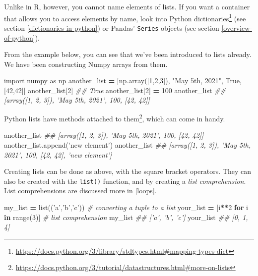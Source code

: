 \documentclass[12pt,krantz2]{krantz}
\makeatletter
\newenvironment{Shaded}{\begin{snugshade}}{\end{snugshade}}
\newcommand{\BuiltInTok}[1]{#1}
\newcommand{\CommentTok}[1]{\textcolor[rgb]{0.37,0.37,0.37}{\textit{#1}}}
\newcommand{\ControlFlowTok}[1]{\textcolor[rgb]{0.27,0.27,0.27}{\textbf{#1}}}
\newcommand{\DecValTok}[1]{\textcolor[rgb]{0.06,0.06,0.06}{#1}}
\newcommand{\ImportTok}[1]{#1}
\newcommand{\KeywordTok}[1]{\textcolor[rgb]{0.27,0.27,0.27}{\textbf{#1}}}
\newcommand{\NormalTok}[1]{#1}
\newcommand{\OperatorTok}[1]{\textcolor[rgb]{0.43,0.43,0.43}{\textbf{#1}}}
\newcommand{\StringTok}[1]{\textcolor[rgb]{0.5,0.5,0.5}{#1}}
\newcommand{\VariableTok}[1]{\textcolor[rgb]{0,0,0}{#1}}
\renewcommand{\href}[2]{#2\footnote{\url{#1}}}
\newenvironment{kframe}{%
\medskip{}
\setlength{\fboxsep}{.8em}
 \def\at@end@of@kframe{}%
 \ifinner\ifhmode%
  \def\at@end@of@kframe{\end{minipage}}%
  \begin{minipage}{\columnwidth}%
 \fi\fi%
 \def\FrameCommand##1{\hskip\@totalleftmargin \hskip-\fboxsep
 \colorbox{shadecolor}{##1}\hskip-\fboxsep
     \hskip-\linewidth \hskip-\@totalleftmargin \hskip\columnwidth}%
 \MakeFramed {\advance\hsize-\width
   \@totalleftmargin\z@ \linewidth\hsize
   \@setminipage}}%
 {\par\unskip\endMakeFramed%
 \at@end@of@kframe}
\renewenvironment{Shaded}{\begin{kframe}}{\end{kframe}}
\makeatother
\begin{document}
Unlike in R, however, you cannot name elements of lists. If you want a container that allows you to access elements by name, look into Python \href{https://docs.python.org/3/library/stdtypes.html\#mapping-types-dict}{dictionaries} (see section \ref{dictionaries-in-python}) or Pandas' \texttt{Series} objects (see section \ref{overview-of-python}).

From the example below, you can see that we've been introduced to lists already. We have been constructing Numpy arrays from them.

\begin{Shaded}
\begin{Highlighting}[]
\ImportTok{import}\NormalTok{ numpy }\ImportTok{as}\NormalTok{ np}
\NormalTok{another_list }\OperatorTok{=}\NormalTok{ [np.array([}\DecValTok{1}\NormalTok{,}\DecValTok{2}\NormalTok{,}\DecValTok{3}\NormalTok{]), }\StringTok{"May 5th, 2021"}\NormalTok{, }\VariableTok{True}\NormalTok{, [}\DecValTok{42}\NormalTok{,}\DecValTok{42}\NormalTok{]]}
\NormalTok{another_list[}\DecValTok{2}\NormalTok{]}
\CommentTok{## True}
\NormalTok{another_list[}\DecValTok{2}\NormalTok{] }\OperatorTok{=} \DecValTok{100}
\NormalTok{another_list}
\CommentTok{## [array([1, 2, 3]), 'May 5th, 2021', 100, [42, 42]]}
\end{Highlighting}
\end{Shaded}

Python lists have \href{https://docs.python.org/3/tutorial/datastructures.html\#more-on-lists}{methods attached to them}, which can come in handy.

\begin{Shaded}
\begin{Highlighting}[]
\NormalTok{another_list}
\CommentTok{## [array([1, 2, 3]), 'May 5th, 2021', 100, [42, 42]]}
\NormalTok{another_list.append(}\StringTok{'new element'}\NormalTok{)}
\NormalTok{another_list}
\CommentTok{## [array([1, 2, 3]), 'May 5th, 2021', 100, [42, 42], 'new element']}
\end{Highlighting}
\end{Shaded}

Creating lists can be done as above, with the square bracket operators. They can also be created with the \texttt{list()} function, and by creating a \emph{list comprehension}. List comprehensions are discussed more in \ref{loops}.

\begin{Shaded}
\begin{Highlighting}[]
\NormalTok{my_list }\OperatorTok{=} \BuiltInTok{list}\NormalTok{((}\StringTok{'a'}\NormalTok{,}\StringTok{'b'}\NormalTok{,}\StringTok{'c'}\NormalTok{)) }\CommentTok{# converting a tuple to a list}
\NormalTok{your_list }\OperatorTok{=}\NormalTok{ [i}\OperatorTok{**}\DecValTok{2} \ControlFlowTok{for}\NormalTok{ i }\KeywordTok{in} \BuiltInTok{range}\NormalTok{(}\DecValTok{3}\NormalTok{)] }\CommentTok{# list comprehension}
\NormalTok{my_list}
\CommentTok{## ['a', 'b', 'c']}
\NormalTok{your_list}
\CommentTok{## [0, 1, 4]}
\end{Highlighting}
\end{Shaded}
\end{document}

